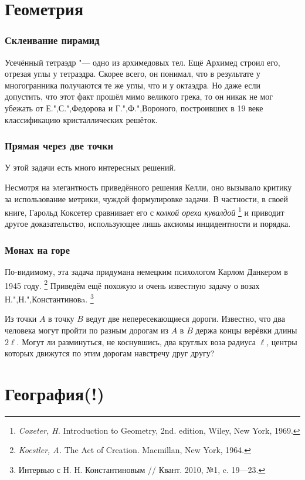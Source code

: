\documentclass[twoside]{book}
\begin{document}
\section{Геометрия}

\subsubsection*{Склеивание пирамид}
Усечённый тетраэдр "--- одно из архимедовых тел.
Ещё Архимед строил его, отрезая углы у тетраэдра.
Скорее всего, он понимал, что в результате у многогранника получаются те же углы, что и у октаэдра.
Но даже если допустить, что этот факт прошёл мимо великого грека, то он никак не мог убежать от Е.",С.",Федорова и Г.",Ф.",Вороного, построивших в 19 веке классификацию кристаллических решёток.

\subsubsection{Прямая через две точки}
У этой задачи есть много интересных решений.

Несмотря на элегантность приведённого решения Келли, оно вызывало критику за использование метрики, чуждой формулировке задачи.
В частности, в своей книге, Гарольд  Коксетер сравнивает его с \emph{колкой ореха кувалдой}%
\footnote{\emph{Coxeter, H.} Introduction to Geometry, 2nd. edition, Wiley, New York, 1969.}
и приводит другое доказательство, использующее лишь аксиомы инцидентности и порядка.

\subsubsection{Монах на горе}
По-видимому, эта задача придумана немецким психологом Карлом Данкером в 1945 году.%
\footnote{\emph{Koestler, A.} The Act of Creation. Macmillan, New York, 1964.}
Приведём ещё похожую и очень известную задачу о возах Н.",Н.",Константиновa.
\footnote{Интервью с Н. Н. Константиновым /\!/ Квант. 2010, №1, c. 19---23.}

Из точки $A$ в точку $B$ ведут две непересекающиеся дороги.
Известно, что два человека могут пройти по разным дорогам из $A$ в $B$ держа концы верёвки длины $2\ell$.
Могут ли разминуться, не коснувшись, два круглых воза радиуса $\ell$, центры которых движутся по
этим дорогам навстречу друг другу?

\section{География(!)}
\end{document}
